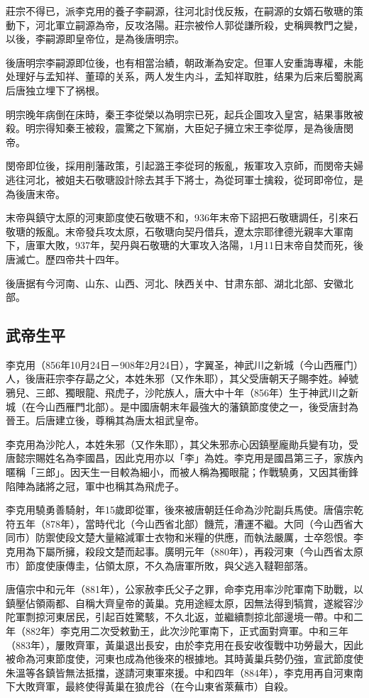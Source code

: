 莊宗不得已，派李克用的養子李嗣源，往河北討伐反叛，在嗣源的女婿石敬瑭的策動下，河北軍立嗣源為帝，反攻洛陽。莊宗被伶人郭從謙所殺，史稱興教門之變，以後，李嗣源即皇帝位，是為後唐明宗。

後唐明宗李嗣源即位後，也有相當治績，朝政漸為安定。但軍人安重誨專權，未能处理好与孟知祥、董璋的关系，两人发生内斗，孟知祥取胜，结果为后来后蜀脱离后唐独立埋下了祸根。

明宗晚年病倒在床時，秦王李從榮以為明宗已死，起兵企圖攻入皇宮，結果事敗被殺。明宗得知秦王被殺，震驚之下駕崩，大臣妃子擁立宋王李從厚，是為後唐閔帝。

閔帝即位後，採用削藩政策，引起潞王李從珂的叛亂，叛軍攻入京師，而閔帝夫婦逃往河北，被姐夫石敬瑭設計除去其手下將士，為從珂軍士擒殺，從珂即帝位，是為後唐末帝。

末帝與鎮守太原的河東節度使石敬瑭不和，936年末帝下詔把石敬瑭調任，引來石敬瑭的叛亂。末帝發兵攻太原，石敬瑭向契丹借兵，遼太宗耶律德光親率大軍南下，唐軍大敗，937年，契丹與石敬瑭的大軍攻入洛陽，1月11日末帝自焚而死，後唐滅亡。歷四帝共十四年。

後唐据有今河南、山东、山西、河北、陕西关中、甘肃东部、湖北北部、安徽北部。

\subsection{武帝生平}

李克用（856年10月24日－908年2月24日），字翼圣，神武川之新城（今山西雁门）人，後唐莊宗李存勗之父，本姓朱邪（又作朱耶），其父受唐朝天子賜李姓。綽號鴉兒、三郎、獨眼龍、飛虎子，沙陀族人，唐大中十年（856年）生于神武川之新城（在今山西雁門北部）。是中國唐朝末年最強大的藩鎮節度使之一，後受唐封為晉王。后唐建立後，尊稱其為唐太祖武皇帝。

李克用為沙陀人，本姓朱邪（又作朱耶），其父朱邪赤心因鎮壓龐勛兵變有功，受唐懿宗賜姓名為李國昌，因此克用亦以「李」為姓。李克用是國昌第三子，家族內暱稱「三郎」。因天生一目較為細小，而被人稱為獨眼龍；作戰驍勇，又因其衝鋒陷陣為諸將之冠，軍中也稱其為飛虎子。

李克用驍勇善騎射，年15歲即從軍，後來被唐朝廷任命為沙陀副兵馬使。唐僖宗乾符五年（878年），當時代北（今山西省北部）饑荒，漕運不繼。大同（今山西省大同市）防禦使段文楚大量縮減軍士衣物和米糧的供應，而執法嚴厲，士卒怨恨。李克用為下屬所擁，殺段文楚而起事。廣明元年（880年），再殺河東（今山西省太原市）節度使康傳圭，佔領太原，不久為唐軍所敗，與父逃入韃靼部落。

唐僖宗中和元年（881年），公家赦李氏父子之罪，命李克用率沙陀軍南下助戰，以鎮壓佔領兩都、自稱大齊皇帝的黃巢。克用途經太原，因無法得到犒賞，遂縱容沙陀軍剽掠河東居民，引起百姓驚駭，不久北返，並繼續剽掠北部邊境一帶。中和二年（882年）李克用二次受敕勤王，此次沙陀軍南下，正式面對齊軍。中和三年（883年），屢敗齊軍，黃巢退出長安，由於李克用在長安收復戰中功勞最大，因此被命為河東節度使，河東也成為他後來的根據地。其時黃巢兵勢仍強，宣武節度使朱溫等各鎮皆無法抵擋，遂請河東軍來援。中和四年（884年），李克用再自河東南下大敗齊軍，最終使得黃巢在狼虎谷（在今山東省萊蕪市）自殺。

